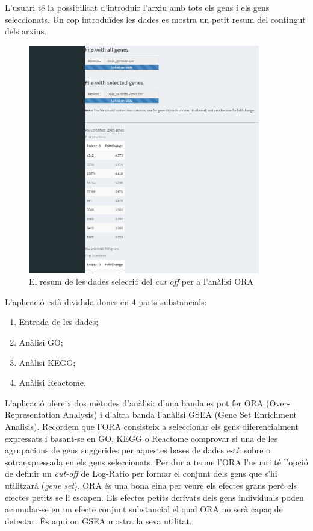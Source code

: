 \documentclass[]{article}
\begin{document}
L'usuari té la possibilitat d'introduir l'arxiu amb tots els gens i els gens seleccionats. Un cop introduïdes les dades es mostra un petit resum del contingut dels arxius.

\begin{figure}[H]
\caption{El resum de les dades selecció del \textit{cut off} per a l'anàlisi ORA}
\centering
\includegraphics[width=0.9\textwidth]{App_F1b}
\end{figure}


L'aplicació està dividida doncs en 4 parts substancials:

\begin{enumerate}
\item Entrada de les dades;
\item Anàlisi GO;
\item Anàlisi KEGG;
\item Anàlisi Reactome.
\end{enumerate}


L'aplicació ofereix dos mètodes d'anàlisi: d'una banda es pot fer ORA (Over-Representation Analysis) i d'altra banda l'anàlisi GSEA (Gene Set Enrichment Analisis). Recordem que l'ORA consisteix a seleccionar els gens diferencialment expressats i basant-se en GO, KEGG o Reactome comprovar si una de les agrupacions de gens suggerides per aquestes bases de dades està sobre o sotraexpressada en els gens seleccionats. Per dur a terme l'ORA l'usuari té l’opció de definir un \textit{cut-off} de Log-Ratio per formar el conjunt dels gens que s'hi utilitzarà (\textit{gene set}). ORA és una bona eina per veure els efectes grans però els efectes petits se li escapen. Els efectes petits derivats dels gens individuals poden acumular-se en un efecte conjunt substancial el qual ORA no serà capaç de detectar. És aquí on GSEA mostra la seva utilitat. 
\end{document}
